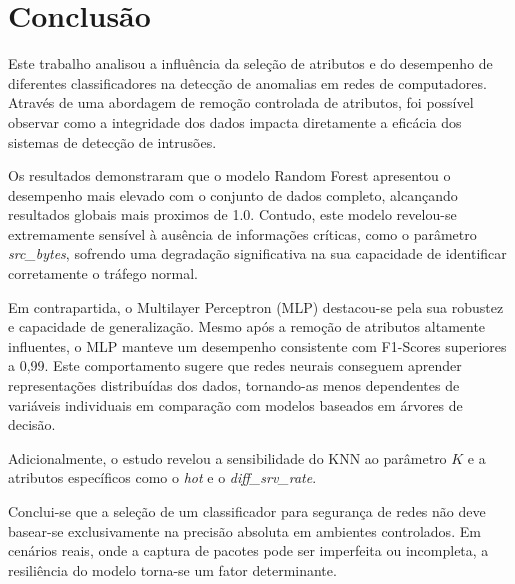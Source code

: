 \section{Conclusão}

Este trabalho analisou a influência da seleção de atributos e do desempenho de diferentes classificadores na detecção de anomalias em redes de computadores. Através de uma abordagem de remoção controlada de atributos, foi possível observar como a integridade dos dados impacta diretamente a eficácia dos sistemas de detecção de intrusões.

Os resultados demonstraram que o modelo Random Forest apresentou o desempenho mais elevado com o conjunto de dados completo, alcançando resultados globais mais proximos de 1.0. Contudo, este modelo revelou-se extremamente sensível à ausência de informações críticas, como o parâmetro \textit{src\_bytes}, sofrendo uma degradação significativa na sua capacidade de identificar corretamente o tráfego normal.

Em contrapartida, o Multilayer Perceptron (MLP) destacou-se pela sua robustez e capacidade de generalização. Mesmo após a remoção de atributos altamente influentes, o MLP manteve um desempenho consistente com F1-Scores superiores a 0,99. Este comportamento sugere que redes neurais conseguem aprender representações distribuídas dos dados, tornando-as menos dependentes de variáveis individuais em comparação com modelos baseados em árvores de decisão.

Adicionalmente, o estudo revelou a sensibilidade do KNN ao parâmetro $K$ e a atributos específicos como o \textit{hot} e o \textit{diff\_srv\_rate}.

Conclui-se que a seleção de um classificador para segurança de redes não deve basear-se exclusivamente na precisão absoluta em ambientes controlados. Em cenários reais, onde a captura de pacotes pode ser imperfeita ou incompleta, a resiliência do modelo torna-se um fator determinante.
